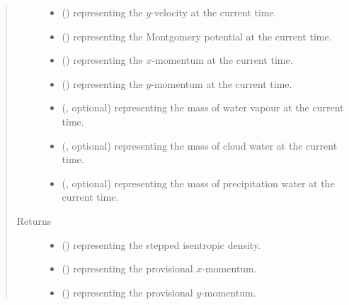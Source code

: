 \documentclass[letterpaper,10pt,english]{sphinxmanual}
\begin{document}
\begin{fulllineitems}
\begin{fulllineitems}
\begin{quote}
\begin{description}
\begin{itemize}
\item {} 
 () \textendash{}  representing the \(y\)-velocity at the current time.

\item {} 
 () \textendash{}  representing the Montgomery potential at the current time.

\item {} 
 () \textendash{}  representing the \(x\)-momentum at the current time.

\item {} 
 () \textendash{}  representing the \(y\)-momentum at the current time.

\item {} 
 (, optional) \textendash{}  representing the mass of water vapour at the current time.

\item {} 
 (, optional) \textendash{}  representing the mass of cloud water at the current time.

\item {} 
 (, optional) \textendash{}  representing the mass of precipitation water at the current time.

\end{itemize}

\item[{Returns}] \leavevmode
\begin{itemize}
\item {} 
 () \textendash{}  representing the stepped isentropic density.

\item {} 
 () \textendash{}  representing the provisional \(x\)-momentum.

\item {} 
 () \textendash{}  representing the provisional \(y\)-momentum.


\end{itemize}
\end{description}
\end{quote}
\end{fulllineitems}
\end{fulllineitems}
\end{document}
